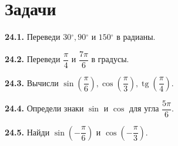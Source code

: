 \section*{Задачи}
\begingroup\setlength{\parskip}{2pt}
\noindent\begin{minipage}[t]{\linewidth}\textbf{24.1.} Переведи \(30 {}^{\circ},\allowbreak 90 {}^{\circ}\) и \(150 {}^{\circ}\) в радианы.\par\end{minipage}\par
\noindent\begin{minipage}[t]{\linewidth}\textbf{24.2.} Переведи \(\dfrac{\pi }{4}\) и \(\dfrac{7 \pi }{6}\) в градусы.\par\end{minipage}\par
\noindent\begin{minipage}[t]{\linewidth}\textbf{24.3.} Вычисли \(\sin  (\dfrac{\pi }{6}),\allowbreak \cos  (\dfrac{\pi }{3}),\allowbreak \operatorname{tg}  (\dfrac{\pi }{4})\).\par\end{minipage}\par
\noindent\begin{minipage}[t]{\linewidth}\textbf{24.4.} Определи знаки \(\sin \) и \(\cos \) для угла \(\dfrac{5 \pi }{6}\).\par\end{minipage}\par
\noindent\begin{minipage}[t]{\linewidth}\textbf{24.5.} Найди \(\sin  (- \dfrac{\pi }{6})\) и \(\cos  (- \dfrac{\pi }{3})\).\par\end{minipage}\par
